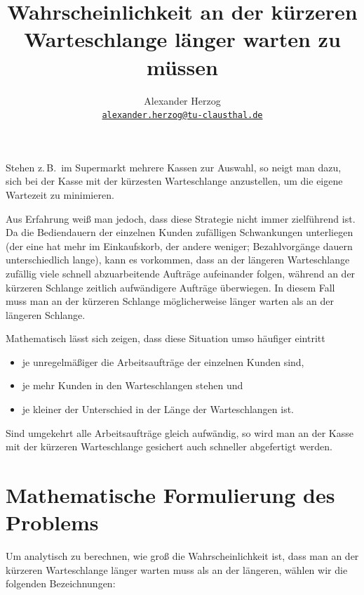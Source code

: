 \documentclass[a4paper,11pt,oneside]{article}
\begin{document}
\title{Wahrscheinlichkeit an der kürzeren Warteschlange länger warten zu müssen}
\author{Alexander Herzog\\\href{mailto:alexander.herzog@tu-clausthal.de}{\small\texttt{alexander.herzog@tu-clausthal.de}}}
\date{}

\maketitle

Stehen z.\,B.\ im Supermarkt mehrere Kassen zur Auswahl, so neigt man dazu, sich bei der Kasse mit der kürzesten Warteschlange anzustellen, um die eigene Wartezeit zu minimieren.

Aus Erfahrung weiß man jedoch, dass diese Strategie nicht immer zielführend ist. Da die Bediendauern der einzelnen Kunden zufälligen Schwankungen unterliegen (der eine hat mehr im Einkaufskorb, der andere weniger; Bezahlvorgänge dauern unterschiedlich lange), kann es vorkommen, dass an der längeren Warteschlange zufällig viele schnell abzuarbeitende Aufträge aufeinander folgen, während an der kürzeren Schlange zeitlich aufwändigere Aufträge überwiegen. In diesem Fall muss man an der kürzeren Schlange möglicherweise länger warten als an der längeren Schlange.

Mathematisch lässt sich zeigen, dass diese Situation umso häufiger eintritt
\begin{itemize}
\item je unregelmäßiger die Arbeitsaufträge der einzelnen Kunden sind,
\item je mehr Kunden in den Warteschlangen stehen und
\item je kleiner der Unterschied in der Länge der Warteschlangen ist.
\end{itemize}

Sind umgekehrt alle Arbeitsaufträge gleich aufwändig, so wird man an der Kasse mit der kürzeren Warteschlange gesichert auch schneller abgefertigt werden.



\section{Mathematische Formulierung des Problems}

Um analytisch zu berechnen, wie groß die Wahrscheinlichkeit ist, dass man an der kürzeren Warteschlange länger warten muss als an der längeren, wählen wir die folgenden Bezeichnungen:
\end{document}
